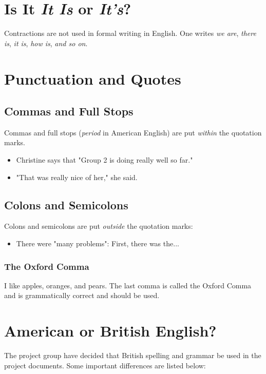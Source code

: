 \documentclass{article}
\begin{document}
\section{Is It \textit{It Is} or \textit{It's}?}
Contractions are not used in formal writing in English. One writes \textit{we are}, \textit{there is}, \textit{it is}, \textit{how is}, \textit{and so on}. 



\section{Punctuation and Quotes}

\subsection{Commas and Full Stops}
Commas and full stops (\textit{period} in American English) are put \textit{within} the quotation marks.

\begin{itemize}
    \item Christine says that "Group 2 is doing really well so far." 
    \item "That was really nice of her," she said.
\end{itemize}

\subsection{Colons and Semicolons}

Colons and semicolons are put \textit{outside} the quotation marks:

\begin{itemize}
    \item There were "many problems": First, there was the...
\end{itemize}

\subsubsection{The Oxford Comma}
I like apples, oranges, and pears. The last comma is called the Oxford Comma and is grammatically correct and should be used.

\section{American or British English?}

The project group have decided that British spelling and grammar be used in the project documents. Some important differences are listed below:
\end{document}
